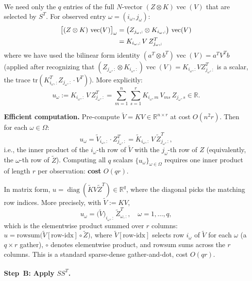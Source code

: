 \documentclass[12pt]{article}
\theoremstyle{definition}
\DeclareMathOperator{\vecop}{vec}
\DeclareMathOperator{\diag}{diag}
\begin{document}
We need only the $q$ entries of the full $N$-vector $(Z \otimes K)\vecop(V)$ that are selected
by $S^T$.  For observed entry $\omega = (i_\omega, j_\omega)$:
\begin{align}
  \bigl[(Z \otimes K)\,\vecop(V)\bigr]_\omega
  &= \bigl(Z_{j_\omega,:} \otimes K_{i_\omega,:}\bigr)\,\vecop(V) \notag \\
  &= K_{i_\omega,:}\,V\,Z_{j_\omega,:}^T
  \label{eq:u-omega}
\end{align}
where we have used the bilinear form identity
$(a^T \otimes b^T)\vecop(V) = a^T V^T b$ (applied after recognizing that
$(Z_{j_\omega,:} \otimes K_{i_\omega,:})\vecop(V) = K_{i_\omega,:} V Z_{j_\omega,:}^T$
is a scalar, the trace $\mathrm{tr}(K_{i_\omega,:}^T Z_{j_\omega,:} \cdot V^T)$).
More explicitly:
\[
  u_\omega := K_{i_\omega,:}\,V\,Z_{j_\omega,:}^T
            = \sum_{m=1}^n \sum_{s=1}^r K_{i_\omega, m}\,V_{ms}\,Z_{j_\omega, s} \in \mathbb{R}.
\]

\textbf{Efficient computation.}  Pre-compute $\widetilde{V} = KV \in \mathbb{R}^{n \times r}$
at cost $O(n^2 r)$.  Then for each $\omega \in \Omega$:
\[
  u_\omega = \widetilde{V}_{i_\omega,:} \cdot Z_{j_\omega,:}^T
           = \widetilde{K}_{i_\omega,:}\,V\,\widetilde{Z}_{j_\omega,:}^T,
\]
i.e., the inner product of the $i_\omega$-th row of $\widetilde{V}$ with the $j_\omega$-th row
of $Z$ (equivalently, the $\omega$-th row of $\widetilde{Z}$).  Computing all $q$ scalars
$\{u_\omega\}_{\omega \in \Omega}$ requires one inner product of length $r$ per observation:
\textbf{cost} $O(qr)$.

In matrix form, $u = \diag(\widetilde{K} V \widetilde{Z}^T) \in \mathbb{R}^q$, where the
diagonal picks the matching row indices.  More precisely, with $\widetilde{V} := KV$,
\[
  u_\omega = \bigl(\widetilde{V}\bigr)_{i_\omega,:}\,\widetilde{Z}_{\omega,:}^T,
  \quad \omega = 1, \dots, q,
\]
which is the elementwise product summed over $r$ columns:
$u = \mathrm{rowsum}\bigl(\widetilde{V}[\text{row-idx}] \circ \widetilde{Z}\bigr)$,
where $\widetilde{V}[\text{row-idx}]$ selects row $i_\omega$ of $\widetilde{V}$ for each
$\omega$ (a $q \times r$ gather), $\circ$ denotes elementwise product, and $\mathrm{rowsum}$
sums across the $r$ columns.  This is a standard sparse-dense gather-and-dot, cost $O(qr)$.

\paragraph{Step~B: Apply $SS^T$.}
\end{document}
